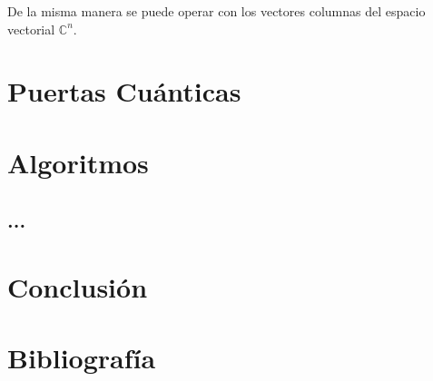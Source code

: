 \documentclass[a4paper]{article}
\numberwithin{equation}{section}
\begin{document}
De la misma manera se puede operar con los vectores columnas del espacio vectorial $\mathbb{C}^n$.











\newpage

\section{Puertas Cuánticas}%

\newpage

\section{Algoritmos}

\subsection{...}

\newpage

\section{Conclusión}

\newpage

\section{Bibliografía}


\end{document}
